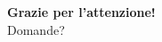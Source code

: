 \documentclass[aspectratio=169, 10pt]{beamer}
\begin{document}
\begin{frame}
    \begin{center}
        \Huge \textbf{Grazie per l'attenzione!}\\
        \vspace{1cm}
        \Large Domande?
    \end{center}
\end{frame}
\end{document}
